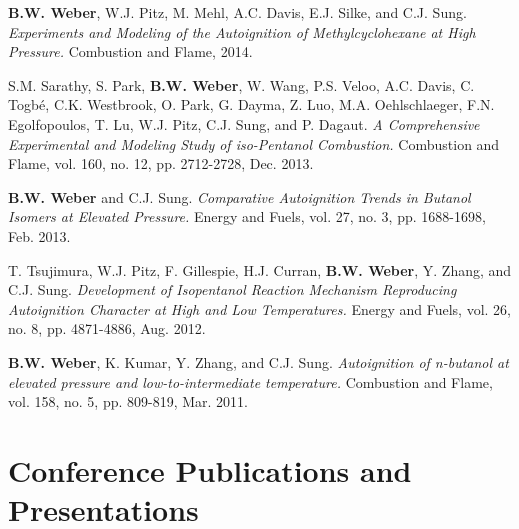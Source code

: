 \begin{bibsection}
\item[] \textbf{B.W. Weber}, W.J. Pitz, M. Mehl, A.C. Davis,
        E.J. Silke, and C.J. Sung. \textit{Experiments and
        Modeling of the Autoignition of Methylcyclohexane at High
        Pressure.} Combustion and Flame, 2014.

\item[] S.M. Sarathy, S. Park, \textbf{B.W. Weber}, W. Wang,
        P.S. Veloo, A.C. Davis, C. Togbé, C.K. Westbrook, O. Park,
        G. Dayma, Z. Luo, M.A. Oehlschlaeger, F.N. Egolfopoulos,
        T. Lu, W.J. Pitz, C.J. Sung, and P. Dagaut. \textit{A
        Comprehensive Experimental and Modeling Study of iso-Pentanol
        Combustion.} Combustion and Flame, vol. 160, no. 12, pp.
        2712-2728, Dec. 2013. 

\item[] \textbf{B.W. Weber} and C.J. Sung. \textit{Comparative
        Autoignition Trends in Butanol Isomers at Elevated Pressure.}
        Energy and Fuels, vol. 27, no. 3, pp. 1688-1698, Feb. 2013. \\

\item[] T. Tsujimura, W.J. Pitz, F. Gillespie, H.J. Curran,
        \textbf{B.W. Weber}, Y. Zhang, and C.J. Sung.
        \textit{Development of Isopentanol Reaction Mechanism
        Reproducing Autoignition Character at High and Low
        Temperatures.} Energy and Fuels, vol. 26, no. 8, pp. 4871-4886,
        Aug. 2012. 

\item[] \textbf{B.W. Weber}, K. Kumar, Y. Zhang, and C.J. Sung.
        \textit{Autoignition of n-butanol at elevated pressure and
        low-to-intermediate temperature.} Combustion and Flame,
        vol. 158, no. 5, pp. 809-819, Mar. 2011.
\end{bibsection}


\section{Conference Publications and Presentations}

